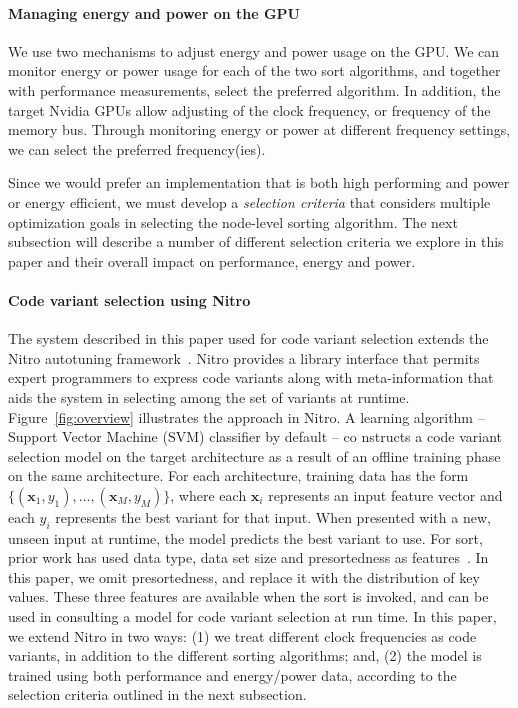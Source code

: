 \paragraph{Managing energy and power on the GPU} 
We use two mechanisms to adjust energy and power usage on the GPU.  
We can monitor energy or power usage for each of the two 
sort algorithms, and together with performance measurements,
select the preferred algorithm.  In addition, the target Nvidia GPUs
allow adjusting of the clock frequency, or frequency of the memory
bus.  Through monitoring energy or power at different frequency
settings, we can select the preferred frequency(ies).  

Since we would prefer an implementation that is both high performing and
power or energy efficient, we must develop a \emph{selection 
criteria} that considers multiple optimization goals in selecting the
node-level sorting algorithm.
The next subsection will describe
a number of different selection criteria we explore in this paper
and their overall impact on performance, energy and power.

\paragraph{Code variant selection using Nitro}
The system described in this paper used for code variant
selection extends
the Nitro autotuning framework~\cite{muralidharan:2014}.
Nitro provides a library interface that permits expert programmers to
express code variants along with meta-information that aids
the system in selecting among the set of variants at runtime.
Figure~\ref{fig:overview} illustrates the approach in Nitro.  
A learning algorithm -- Support Vector Machine (SVM) classifier by default -- co
nstructs a 
code variant selection
model on the target architecture as a result of an offline training phase on the
 same architecture.
For each architecture, training data has the form
$\{(\mathbf{x}_1, y_1), \hdots, (\mathbf{x}_M, y_M)\}$, where
each $\mathbf{x}_i$ represents an input feature vector and each
$y_i$ represents the best variant for that input.
When presented with a new, unseen input at runtime, the model
predicts the best variant to use. 
For sort, prior work has used data type, data set size and presortedness
as features~\cite{muralidharan:2014}.  In this paper,
we omit presortedness, and replace it with the distribution
of key values.  These three features are available when the
sort is invoked, and can be used in consulting a model for code
variant selection at run time.
In this paper, we extend Nitro in two ways: (1) we treat 
different clock frequencies as code variants, in addition to the
different sorting algorithms; and, (2) the model is trained
using both performance and energy/power data, according to the 
selection criteria outlined in the next subsection.


